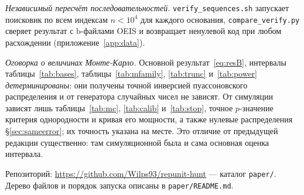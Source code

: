 \documentclass[11pt,a4paper]{article}
\theoremstyle{plain}
\theoremstyle{remark}
\begin{document}
\emph{Независимый пересчёт последовательностей.} \texttt{verify\_sequences.sh}
запускает поисковик по всем индексам $n<10^4$ для каждого основания,
\texttt{compare\_verify.py} сверяет результат с b-файлами OEIS и возвращает
ненулевой код при любом расхождении (приложение~\ref{app:data}).

\emph{Оговорка о величинах Монте-Карло.} Основной результат~\eqref{eq:resB},
интервалы таблицы~\ref{tab:bases}, таблицы~\ref{tab:mfamily}, \ref{tab:trunc}
и~\ref{tab:power} \emph{детерминированы}: они получены точной инверсией
пуассоновского распределения и от генератора случайных чисел не зависят. От
симуляции зависят лишь таблицы~\ref{tab:mc}, \ref{tab:calib} и~\ref{tab:stop}, точное
$p$-значение критерия однородности и кривая его мощности, а также нулевые
распределения \S\ref{sec:sameerror}; их точность указана на месте. Это отличие от
предыдущей редакции существенно: там симуляционной была и сама основная оценка
интервала.

Репозиторий: \url{https://github.com/Wilps93/repunit-hunt} --- каталог
\texttt{paper/}. Дерево файлов и порядок запуска описаны в \texttt{paper/README.md}.
\end{document}

